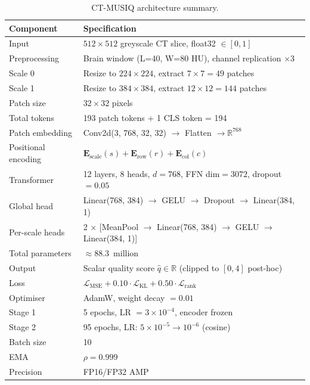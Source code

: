 \begin{table}[h]
    \centering
    \caption{CT-MUSIQ architecture summary.}
    \label{tab:arch_summary}
    \begin{tabular}{ll}
        \toprule
        \textbf{Component} & \textbf{Specification} \\
        \midrule
        Input             & $512 \times 512$ greyscale CT slice, float32 $\in [0,1]$ \\
        Preprocessing     & Brain window (L=40, W=80 HU), channel replication $\times 3$ \\
        Scale 0           & Resize to $224 \times 224$, extract $7 \times 7 = 49$ patches \\
        Scale 1           & Resize to $384 \times 384$, extract $12 \times 12 = 144$ patches \\
        Patch size        & $32 \times 32$ pixels \\
        Total tokens      & 193 patch tokens + 1 CLS token = 194 \\
        Patch embedding   & Conv2d(3, 768, 32, 32) $\to$ Flatten $\to \mathbb{R}^{768}$ \\
        Positional encoding & $\mathbf{E}_{\text{scale}}(s) + \mathbf{E}_{\text{row}}(r) + \mathbf{E}_{\text{col}}(c)$ \\
        Transformer       & 12 layers, 8 heads, $d=768$, FFN dim$=3072$, dropout$=0.05$ \\
        Global head       & Linear(768, 384) $\to$ GELU $\to$ Dropout $\to$ Linear(384, 1) \\
        Per-scale heads   & 2 $\times$ [MeanPool $\to$ Linear(768, 384) $\to$ GELU $\to$ Linear(384, 1)] \\
        Total parameters  & $\approx 88.3$~million \\
        Output            & Scalar quality score $\hat{q} \in \mathbb{R}$ (clipped to $[0,4]$ post-hoc) \\
        \midrule
        Loss              & $\mathcal{L}_{\text{MSE}} + 0.10 \cdot \mathcal{L}_{\text{KL}} + 0.50 \cdot \mathcal{L}_{\text{rank}}$ \\
        Optimiser         & AdamW, weight decay $= 0.01$ \\
        Stage 1           & 5 epochs, LR $= 3 \times 10^{-4}$, encoder frozen \\
        Stage 2           & 95 epochs, LR: $5 \times 10^{-5} \to 10^{-6}$ (cosine) \\
        Batch size        & 10 \\
        EMA               & $\rho = 0.999$ \\
        Precision         & FP16/FP32 AMP \\
        \bottomrule
    \end{tabular}
\end{table}

